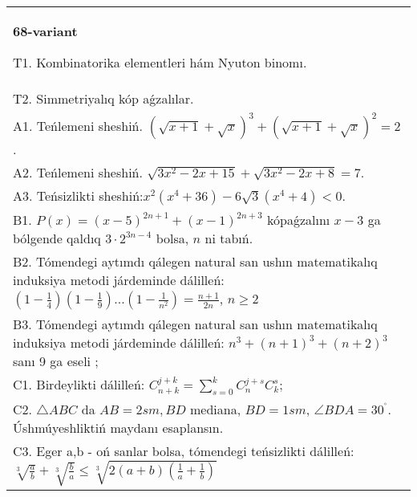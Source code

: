 \documentclass{article}
\begin{document}
\begin{tabular}{m{17cm}}
\textbf{68-variant}
\newline

T1. Kombinatorika elementleri hám Nyuton binomı. \\
T2. Simmetriyalıq kóp aǵzalılar. \\
A1. Teńlemeni sheshiń. \((\sqrt{x + 1} + \sqrt{x})^{3} + (\sqrt{x + 1} + \sqrt{x})^{2} = 2\). \\
A2. Teńlemeni sheshiń. \(\sqrt{3x^{2} - 2x + 15} + \sqrt{3x^{2} - 2x + 8} = 7\). \\
A3. Teńsizlikti sheshiń:\(x^{2}\left( x^{4} + 36 \right) - 6\sqrt{3}\left( x^{4} + 4 \right) < 0\). \\
B1. \(P(x) = (x - 5)^{2n + 1} + (x - 1)^{2n + 3}\) kópaǵzalını \(x - 3\) ga bólgende qaldıq \(3 \cdot 2^{3n - 4}\) bolsa, \(n\) ni tabıń. \\
B2. Tómendegi aytımdı qálegen natural san ushın matematikalıq induksiya metodi járdeminde dálilleń: \(\left( 1 - \frac{1}{4} \right)\left( 1 - \frac{1}{9} \right)...\left( 1 - \frac{1}{n^{2}} \right) = \frac{n + 1}{2n}\), \(n \geq 2\) \\
B3. Tómendegi aytımdı qálegen natural san ushın matematikalıq induksiya metodi járdeminde dálilleń: \(n^{3} + (n + 1)^{3} + (n + 2)^{3}\) sanı 9 ga eseli ; \\
C1. Birdeylikti dálilleń: \(C_{n + k}^{j + k} = \sum_{s = 0}^{k}C_{n}^{j + s}C_{k}^{s}\); \\
C2. \(\bigtriangleup ABC\) da \(AB = 2sm,BD\) mediana, \(BD = 1sm\), \(\angle BDA = 30^{{^\circ}}\). Úshmúyeshliktiń maydanı esaplansın. \\
C3. Eger a,b - oń sanlar bolsa, tómendegi teńsizlikti dálilleń: \(\sqrt[3]{\frac{a}{b}} + \sqrt[3]{\frac{b}{a}} \leq \sqrt[3]{2(a + b)\left( \frac{1}{a} + \frac{1}{b} \right)}\) \\

\end{tabular}
\vspace{1cm}
\end{document}
